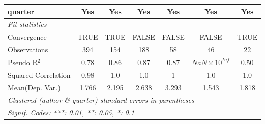 \begin{tabular}{lcccccc}
   quarter                                                    & Yes         & Yes     & Yes          & Yes          & Yes                     & Yes\\  
   \midrule
   \emph{Fit statistics}\\
   Convergence                                                &TRUE         & TRUE    & FALSE        & FALSE        & FALSE                   & TRUE\\  
   Observations                                               & 394         & 154     & 188          & 58           & 46                      & 22\\  
   Pseudo R$^2$                                               & 0.78        & 0.86    & 0.87         & 0.87         & $NaN\times 10^{Inf}$    & 0.50\\  
   Squared Correlation                                        & 0.98        & 1.0     & 1.0          & 1            & 1.0                     & 1.0\\  
Mean(Dep. Var.) & 1.766 & 2.195 & 2.638 & 3.293 & 1.543 & 1.818 \\
   \midrule \midrule
   \multicolumn{7}{l}{\emph{Clustered (author \& quarter) standard-errors in parentheses}}\\
   \multicolumn{7}{l}{\emph{Signif. Codes: ***: 0.01, **: 0.05, *: 0.1}}\\
\end{tabular}
\par\endgroup
